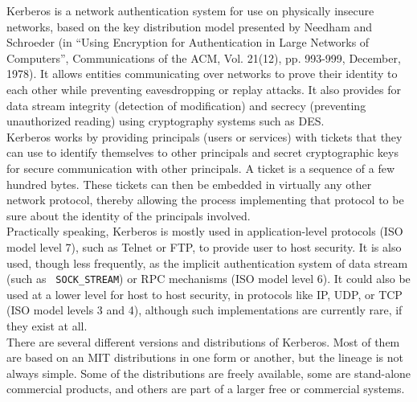 \begin{htmllist}
  
    {\item[What is Kerberos? What is it good for?]}

    Kerberos is a network authentication system for use on physically
    insecure networks, based on the key distribution model presented by
    Needham and Schroeder (in ``Using Encryption for Authentication in
    Large Networks of Computers'', Communications of the ACM, Vol. 21(12),
    pp.  993-999, December, 1978). It allows entities communicating over
    networks to prove their identity to each other while preventing
    eavesdropping or replay attacks. It also provides for data stream
    integrity (detection of modification) and secrecy (preventing
    unauthorized reading) using cryptography systems such as DES.\\
    
    Kerberos works by providing principals (users or services) with tickets
    that they can use to identify themselves to other principals and secret
    cryptographic keys for secure communication with other principals. A
    ticket is a sequence of a few hundred bytes. These tickets can then be
    embedded in virtually any other network protocol, thereby allowing the
    process implementing that protocol to be sure about the identity of the
    principals involved.\\
    
    Practically speaking, Kerberos is mostly used in application-level
    protocols (ISO model level 7), such as Telnet or FTP, to provide user
    to host security. It is also used, though less frequently, as the
    implicit authentication system of data stream (such as {\tt
      SOCK\_STREAM}) or RPC mechanisms (ISO model level 6). It could also
    be used at a lower level for host to host security, in protocols like
    IP, UDP, or TCP (ISO model levels 3 and 4), although such
    implementations are currently
    rare, if they exist at all.\\
  
    There are several different versions and distributions of Kerberos.
    Most of them are based on an MIT distributions in one form or another,
    but the lineage is not always simple. Some of the distributions are
    freely available, some are stand-alone commercial products, and others
    are part of a larger free or commercial systems.\\
  

\end{htmllist}
